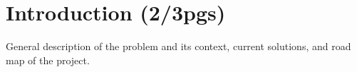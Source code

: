 
% 
% 

\section{Introduction (2/3pgs)}

General description of the problem and its context, current solutions, and road map of the project.